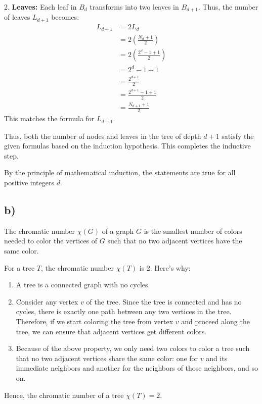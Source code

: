 \documentclass[12pt]{article}
\begin{document}
2. \textbf{Leaves:} Each leaf in \( B_d \) transforms into two leaves in \( B_{d+1} \). Thus, the number of leaves \( L_{d+1} \) becomes:
\begin{align*}
L_{d+1} &= 2L_d \\
&= 2 \left( \frac{N_d + 1}{2} \right) \\
&= 2 \left( \frac{2^d - 1 + 1}{2} \right) \\
&= 2^d - 1 + 1 \\
&= \frac{2^{d+1}}{2}  \\
&= \frac{2^{d+1} - 1 +1}{2}  \\
&= \frac{N_{d+1} + 1}{2}
\end{align*}
This matches the formula for \( L_{d+1} \).

Thus, both the number of nodes and leaves in the tree of depth \( d+1 \) satisfy the given formulas based on the induction hypothesis. This completes the inductive step.

By the principle of mathematical induction, the statements are true for all positive integers \( d \).


\subsection*{b)}

The chromatic number \( \chi(G) \) of a graph \( G \) is the smallest number of colors needed to color the vertices of \( G \) such that no two adjacent vertices have the same color.

For a tree \( T \), the chromatic number \( \chi(T) \) is 2. Here's why:

\begin{enumerate}
    \item A tree is a connected graph with no cycles.
    \item Consider any vertex \( v \) of the tree. Since the tree is connected and has no cycles, there is exactly one path between any two vertices in the tree. Therefore, if we start coloring the tree from vertex \( v \) and proceed along the tree, we can ensure that adjacent vertices get different colors.
    \item Because of the above property, we only need two colors to color a tree such that no two adjacent vertices share the same color: one for \( v \) and its immediate neighbors and another for the neighbors of those neighbors, and so on.
\end{enumerate}

Hence, the chromatic number of a tree \( \chi(T) = 2 \).
\end{document}
